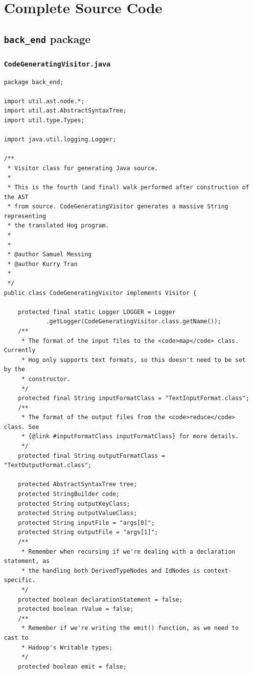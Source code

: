\documentclass{report}
\begin{document}
\chapter{Complete Source Code}

\section{\texttt{back\_end} package}

\subsection{\texttt{CodeGeneratingVisitor.java}}

\begin{verbatim}
package back_end;

import util.ast.node.*;
import util.ast.AbstractSyntaxTree;
import util.type.Types;

import java.util.logging.Logger;

/**
 * Visitor class for generating Java source.
 * 
 * This is the fourth (and final) walk performed after construction of the AST
 * from source. CodeGeneratingVisitor generates a massive String representing
 * the translated Hog program.
 * 
 * 
 * @author Samuel Messing
 * @author Kurry Tran
 * 
 */
public class CodeGeneratingVisitor implements Visitor {

	protected final static Logger LOGGER = Logger
			.getLogger(CodeGeneratingVisitor.class.getName());
	/**
	 * The format of the input files to the <code>map</code> class. Currently
	 * Hog only supports text formats, so this doesn't need to be set by the
	 * constructor.
	 */
	protected final String inputFormatClass = "TextInputFormat.class";
	/**
	 * The format of the output files from the <code>reduce</code> class. See
	 * {@link #inputFormatClass inputFormatClass} for more details.
	 */
	protected final String outputFormatClass = "TextOutputFormat.class";

	protected AbstractSyntaxTree tree;
	protected StringBuilder code;
	protected String outputKeyClass;
	protected String outputValueClass;
	protected String inputFile = "args[0]";
	protected String outputFile = "args[1]";
	/**
	 * Remember when recursing if we're dealing with a declaration statement, as
	 * the handling both DerivedTypeNodes and IdNodes is context-specific.
	 */
	protected boolean declarationStatement = false;
	protected boolean rValue = false;
	/**
	 * Remember if we're writing the emit() function, as we need to cast to
	 * Hadoop's Writable types;
	 */
	protected boolean emit = false;


\end{verbatim}
\end{document}
